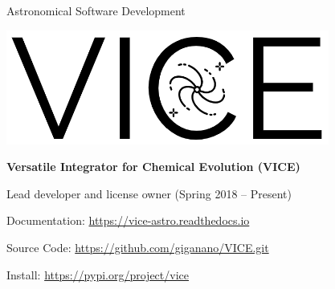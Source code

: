 \documentclass[cv.tex]{subfiles}
\begin{document}
\vspace{5mm}
\noindent
{%
{\color{themecolor}\large Astronomical Software Development}
\par\noindent
\parbox{0.35\textwidth}{%
	\centering
	\includegraphics[scale = 0.33]{vice-logo.png}
}
\parbox{0.63\textwidth}{%
	\textbf{Versatile Integrator for Chemical Evolution (VICE)} \par
	Lead developer and license owner (Spring 2018 -- Present) \par
	Documentation: \url{https://vice-astro.readthedocs.io} \par
	Source Code: \url{https://github.com/giganano/VICE.git} \par
	Install: \url{https://pypi.org/project/vice}
}
}
\end{document}
